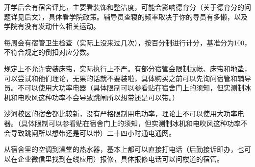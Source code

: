 
开学后会有宿舍评比，主要看装饰和整洁度，可能会影响德育分（关于德育分的问题详见后文），具体看学院政策。辅导员查寝的频率取决于你的导员有多懒，以及学院有没有发动什么相关运动。

每周会有宿管卫生检查（实际上没来过几次），按百分制进行计分，基准分为100，不符合规定的倒扣对应分数。


规定上不允许安装床帘，实际执行上不严。有部分宿管会限制蚊帐、床帘和地垫，可以尝试和他们理论，无果的话就不要装啦，具体购买之前可以先询问宿管和辅导员。不可以使用大功率电器（具体限制可以参看贴在宿舍门上的须知，但实测制冰机和电吹风这种功率不会导致跳闸所以想带还是可以带。）


沙河校区的宿舍都比较新，没有严格限制用电功率，理论上不可以使用大功率电器。（具体限制可以参看贴在宿舍门上的须知，但实测制冰机和电吹风这种功率不会导致跳闸所以想带还是可以带）二十四小时通电通网。

从宿舍里的空调到澡堂的热水器，基本上都可以直接打电话（后勤接诉即办，也可以在企业微信里找到在线应用）报修，具体报修电话可以问楼道的宿管。
